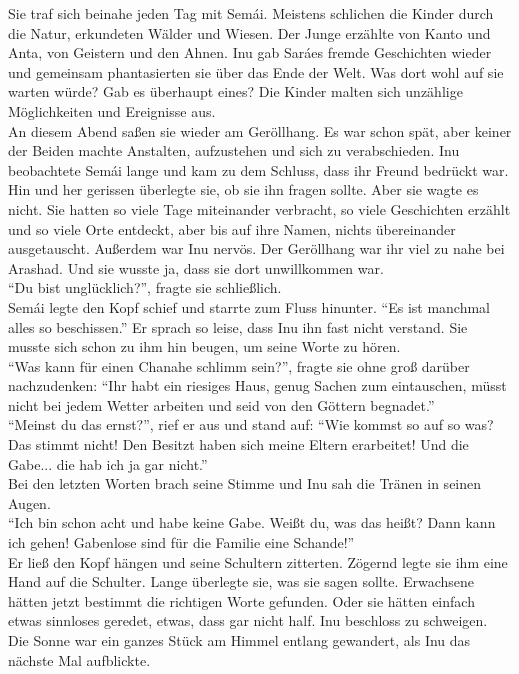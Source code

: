 \documentclass[a4paper,12pt]{book}
\begin{document}
Sie traf sich beinahe jeden Tag mit Semái. Meistens schlichen die Kinder durch die Natur, 
erkundeten Wälder und Wiesen. Der Junge erzählte von Kanto und Anta, von Geistern und den Ahnen. 
Inu gab Saráes fremde Geschichten wieder und gemeinsam phantasierten sie über das Ende der Welt. 
Was dort wohl auf sie warten würde? Gab es überhaupt eines? Die Kinder malten sich unzählige 
Möglichkeiten und Ereignisse aus. \\
An diesem Abend saßen sie wieder am Geröllhang. Es war schon spät, aber keiner der Beiden machte 
Anstalten, aufzustehen und sich zu verabschieden. Inu beobachtete Semái lange und kam zu dem 
Schluss, dass ihr Freund bedrückt war. Hin und her gerissen überlegte sie, ob sie ihn fragen 
sollte. Aber sie wagte es nicht. Sie hatten so viele Tage miteinander verbracht, so viele 
Geschichten erzählt und so viele Orte entdeckt, aber bis auf ihre Namen, nichts übereinander 
ausgetauscht. Außerdem war Inu nervös. Der Geröllhang war ihr viel zu nahe bei Arashad. Und sie 
wusste ja, dass sie dort unwillkommen war. \\
``Du bist unglücklich?'', fragte sie schließlich.\\
Semái legte den Kopf schief und starrte zum Fluss hinunter. ``Es ist manchmal alles so beschissen.''
Er sprach so leise, dass Inu ihn fast nicht verstand. Sie musste sich schon zu ihm hin beugen, um 
seine Worte zu hören. \\
``Was kann für einen Chanahe schlimm sein?'', fragte sie ohne groß darüber nachzudenken: ``Ihr habt 
ein riesiges Haus, genug Sachen zum eintauschen, müsst nicht bei jedem Wetter arbeiten und seid von 
den Göttern begnadet.''\\
``Meinst du das ernst?'', rief er aus und stand auf: ``Wie kommst so auf so was? Das stimmt nicht! 
Den Besitzt haben sich meine Eltern erarbeitet! Und die Gabe... die hab ich ja gar nicht.''\\
Bei den letzten Worten brach seine Stimme und Inu sah die Tränen in seinen Augen. \\
``Ich bin schon acht und habe keine Gabe. Weißt du, was das heißt? Dann kann ich gehen! Gabenlose 
sind für die Familie eine Schande!''\\
Er ließ den Kopf hängen und seine Schultern zitterten. Zögernd legte sie ihm eine Hand auf die 
Schulter. Lange überlegte sie, was sie sagen sollte. Erwachsene hätten jetzt bestimmt die richtigen 
Worte gefunden. Oder sie hätten einfach etwas sinnloses geredet, etwas, dass gar nicht half. Inu 
beschloss zu schweigen. 
Die Sonne war ein ganzes Stück am Himmel entlang gewandert, als Inu das nächste Mal aufblickte.\\
\end{document}
